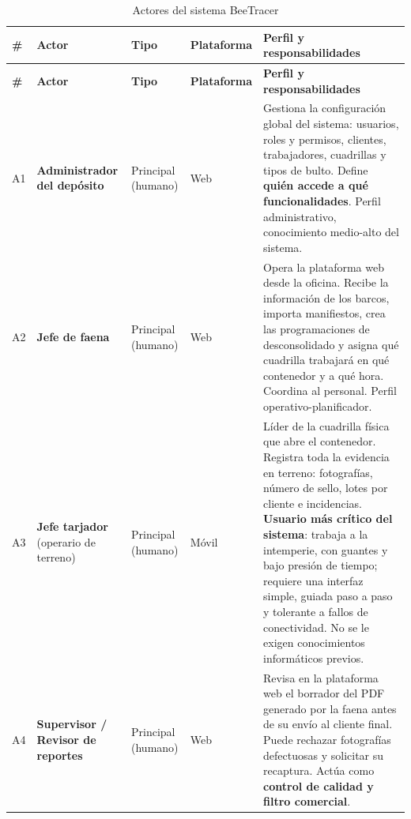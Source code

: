{\estilotabla
\begin{longtable}{L{0.04\textwidth} L{0.17\textwidth} L{0.13\textwidth} L{0.13\textwidth} L{0.44\textwidth}}

\caption{Actores del sistema BeeTracer}
\label{tab:actores}
\\

\toprule
\textbf{\#} & \textbf{Actor} & \textbf{Tipo} & \textbf{Plataforma} &
\textbf{Perfil y responsabilidades} \\
\midrule
\endfirsthead

\toprule
\textbf{\#} & \textbf{Actor} & \textbf{Tipo} & \textbf{Plataforma} &
\textbf{Perfil y responsabilidades} \\
\midrule
\endhead

A1 & \textbf{Administrador del depósito} & Principal (humano) & Web &
Gestiona la configuración global del sistema: usuarios, roles y permisos, clientes, trabajadores,
cuadrillas y tipos de bulto. Define \textbf{quién accede a qué funcionalidades}. Perfil
administrativo, conocimiento medio-alto del sistema. \\

\midrule

A2 & \textbf{Jefe de faena} & Principal (humano) & Web &
Opera la plataforma web desde la oficina. Recibe la información de los barcos, importa manifiestos,
crea las programaciones de desconsolidado y asigna qué cuadrilla trabajará en qué contenedor y a
qué hora. Coordina al personal. Perfil operativo-planificador. \\

\midrule

A3 & \textbf{Jefe tarjador} (operario de terreno) & Principal (humano) & Móvil &
Líder de la cuadrilla física que abre el contenedor. Registra toda la evidencia en terreno:
fotografías, número de sello, lotes por cliente e incidencias. \textbf{Usuario más crítico del
sistema}: trabaja a la intemperie, con guantes y bajo presión de tiempo; requiere una interfaz
simple, guiada paso a paso y tolerante a fallos de conectividad. No se le exigen conocimientos
informáticos previos. \\

\midrule

A4 & \textbf{Supervisor / Revisor de reportes} & Principal (humano) & Web &
Revisa en la plataforma web el borrador del PDF generado por la faena antes de su envío al cliente
final. Puede rechazar fotografías defectuosas y solicitar su recaptura. Actúa como \textbf{control
de calidad y filtro comercial}. \\


\end{longtable}}
